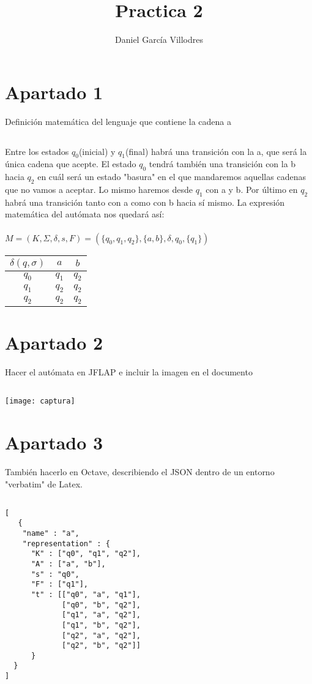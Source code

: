 \documentclass[fleqn, 10pt]{article}
\title{\textbf{Practica 2}}
\author{Daniel García Villodres}
\date{}
\begin{document}
\maketitle
\thispagestyle{empty}

\section*{Apartado 1}
Definición matemática del lenguaje que contiene la cadena a

\subsection*{}
Entre los estados $q_0$(inicial) y $q_1$(final) habrá una transición con la a, que será la única cadena que acepte. El estado $q_0$ tendrá también una transición con la b hacia $q_2$ en cuál será un estado "basura" en el que mandaremos aquellas cadenas que no vamos a aceptar. Lo mismo haremos desde $q_1$ con a y b. Por último en $q_2$ habrá una transición tanto con a como con b hacia sí mismo. La expresión matemática del autómata nos quedará así:\\
\\
$M=(K, \Sigma, \delta,s, F) = (\{q_0,q_1,q_2\}, \{a,b\}, \delta, q_0, \{q_1\})$

\begin{table}[h!]
\begin{tabular}{c|c|c}
  $\delta(q,\sigma)$ & $a$ & $b$\\
  \hline
  $q_0$& $q_1$ & $q_2$\\
  \hline
  $q_1$& $q_2$ & $q_2$\\
  \hline
  $q_2$& $q_2$ & $q_2$
\end{tabular}
\end{table}


\section*{Apartado 2}
Hacer el autómata en JFLAP e incluir la imagen en el documento

\subsection*{}
\texttt{[image: captura]}


\section*{Apartado 3}
También hacerlo en Octave, describiendo el JSON dentro de un entorno "verbatim" de Latex.

\subsection*{}
\begin{verbatim}
[
   {
    "name" : "a",
    "representation" : {
      "K" : ["q0", "q1", "q2"],
      "A" : ["a", "b"],
      "s" : "q0",
      "F" : ["q1"],
      "t" : [["q0", "a", "q1"],
             ["q0", "b", "q2"],
             ["q1", "a", "q2"],
             ["q1", "b", "q2"],
             ["q2", "a", "q2"],
             ["q2", "b", "q2"]]
      }
  }
]
\end{verbatim}
\end{document}
